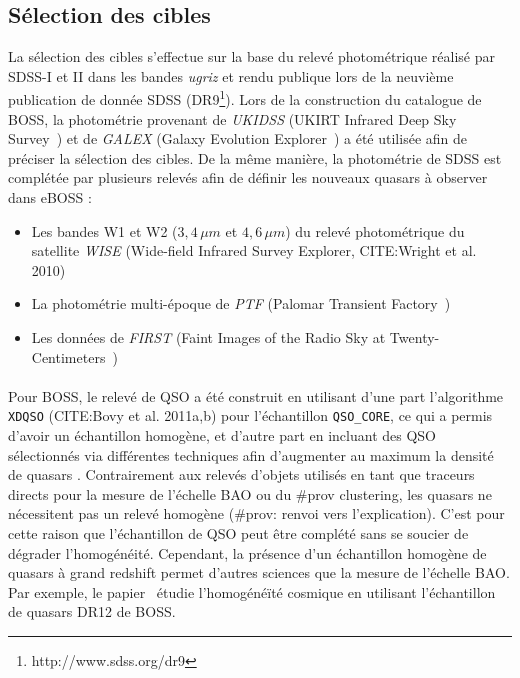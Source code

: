 \documentclass[11pt, twoside, a4paper, openright]{report}
\begin{document}
\subsection{Sélection des cibles}

La sélection des cibles s'effectue sur la base du relevé photométrique réalisé par SDSS-I et II dans les bandes \emph{ugriz} et rendu publique lors de la neuvième publication de donnée SDSS (DR9\footnote{http://www.sdss.org/dr9}).
Lors de la construction du catalogue de BOSS, la photométrie provenant de \emph{UKIDSS} (UKIRT Infrared Deep Sky Survey~\cite{Lawrence2006}) et de \emph{GALEX} (Galaxy Evolution Explorer~\cite{Martin2004}) a été utilisée afin de préciser la sélection des cibles.
De la même manière, la photométrie de SDSS est complétée par plusieurs relevés afin de définir les nouveaux quasars à observer dans eBOSS :
\begin{itemize}
\item Les bandes W1 et W2 ($3,4\,\mu m$ et $4,6\,\mu m$) du relevé photométrique du satellite \emph{WISE} (Wide-field Infrared Survey Explorer, CITE:Wright et al. 2010)
\item La photométrie multi-époque de \emph{PTF} (Palomar Transient Factory~\cite{Law2009})
\item Les données de \emph{FIRST} (Faint Images of the Radio Sky at Twenty-Centimeters~\cite{Becker1995})
\end{itemize}


\paragraph{} Pour BOSS, le relevé de QSO a été construit en utilisant d'une part l'algorithme \texttt{XDQSO} (CITE:Bovy et al. 2011a,b) pour l'échantillon \texttt{QSO\_CORE}, ce qui a permis d'avoir un échantillon homogène, et d'autre part en incluant des QSO sélectionnés via différentes techniques afin d'augmenter au maximum la densité de quasars \lya{}.
Contrairement aux relevés d'objets utilisés en tant que traceurs directs pour la mesure de l'échelle BAO ou du \#prov clustering, les quasars \lya{} ne nécessitent pas un relevé homogène (\#prov: renvoi vers l'explication).
C'est pour cette raison que l'échantillon de QSO \lya{} peut être complété sans se soucier de dégrader l'homogénéité.
Cependant, la présence d'un échantillon homogène de quasars à grand redshift permet d'autres sciences que la mesure de l'échelle BAO.
Par exemple, le papier~\cite{Laurent2016} étudie l'homogénéïté cosmique en utilisant l'échantillon de quasars DR12 de BOSS.
\end{document}
